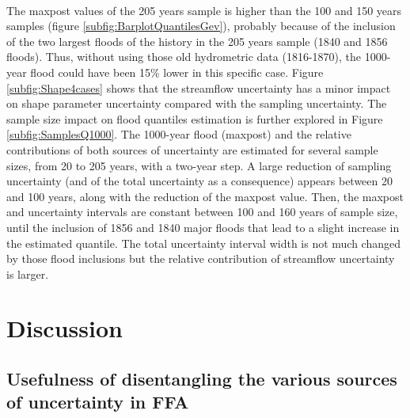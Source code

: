         \paragraph{}
        The maxpost values of the 205 years sample is higher than the 100 and 150 years samples (figure \ref{subfig:BarplotQuantilesGev}), probably because of the inclusion of the two largest floods of the history in the 205 years sample (1840 and 1856 floods). Thus, without using those old hydrometric data (1816-1870), the 1000-year flood could have been 15\% lower in this specific case. Figure \ref{subfig:Shape4cases} shows that the streamflow uncertainty has a minor impact on shape parameter uncertainty compared with the sampling uncertainty. The sample size impact on flood quantiles estimation is further explored in Figure \ref{subfig:SamplesQ1000}. The 1000-year flood (maxpost) and the relative contributions of both sources of uncertainty are estimated for several sample sizes, from 20 to 205 years, with a two-year step. A large reduction of sampling uncertainty (and of the total uncertainty as a consequence) appears between 20 and 100 years, along with the reduction of the maxpost value. Then, the maxpost and uncertainty intervals are constant between 100 and 160 years of sample size, until the inclusion of 1856 and 1840 major floods that lead to a slight increase in the estimated quantile. The total uncertainty interval width is not much changed by those flood inclusions but the relative contribution of streamflow uncertainty is larger.
\FloatBarrier
\section{Discussion}
\label{sec:Discussion}
    \subsection{Usefulness of disentangling the various sources of uncertainty in FFA}

